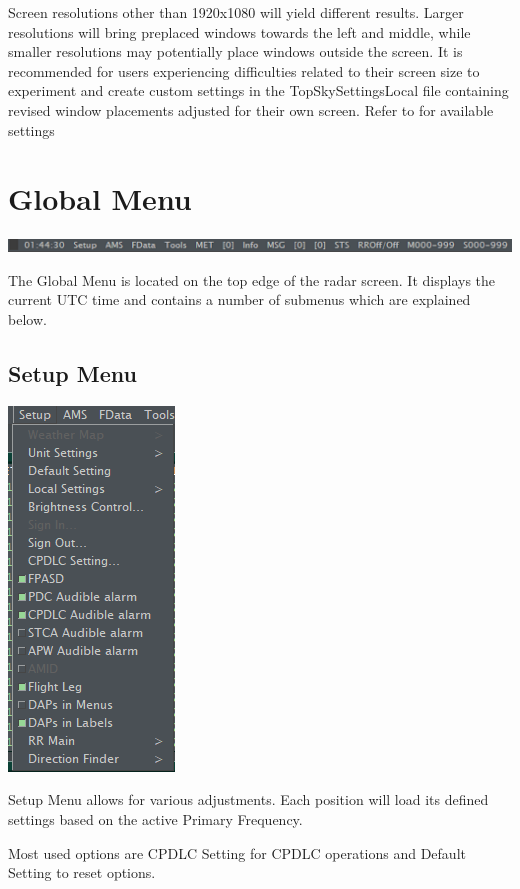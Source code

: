 \documentclass[11pt,a4paper,oldfontcommands]{memoir}
\begin{document}
Screen resolutions other than 1920x1080 will yield different results. Larger resolutions will bring preplaced windows towards the left and middle, while smaller resolutions may potentially place windows outside the screen. It is recommended for users experiencing difficulties related to their screen size to experiment and create custom settings in the TopSkySettingsLocal file containing revised window placements adjusted for their own screen. Refer to \texttt{} for available settings

\section{Global Menu}
\label{menu:global}
\includegraphics{img/globalmenu.png}

The Global Menu is located on the top edge of the radar screen. It displays the current UTC time and contains a number of submenus which are explained below.

\subsection{Setup Menu}
\label{menu:set}
\includegraphics{img/Setup.png}

Setup Menu allows for various adjustments. Each position will load its defined settings based on the active Primary Frequency.

Most used options are CPDLC Setting for CPDLC operations and Default Setting to reset options.
\end{document}
